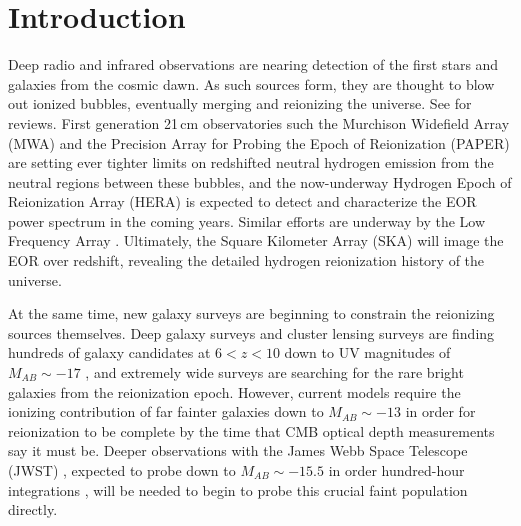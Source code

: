 \documentclass[numberedappendix]{emulateapj}
\begin{document}
\section{Introduction}

Deep radio and infrared observations are nearing detection of the first stars and galaxies from the cosmic dawn. As such sources form, they are thought to blow out ionized bubbles, eventually merging and reionizing the universe. See \citet{FurlanettoReview,miguelreview,PritchardLoebReview,Mesinger16} for reviews. First generation 21\,cm observatories such the Murchison Widefield Array (MWA) \citep{tingay13,mwascience} and the Precision Array for Probing the Epoch of Reionization (PAPER) \citep{parsons14,ali15,PoberPAPER64Heating,DannyMultiRedshift} are setting ever tighter limits on redshifted neutral hydrogen emission from the neutral regions between these bubbles, and the now-underway Hydrogen Epoch of Reionization Array (HERA) \citep{deboer16,neben16b,ewallwice16,patra16} is expected to detect and characterize the EOR power spectrum in the coming years. Similar efforts are underway by the Low Frequency Array \citep{lofareorpaper,lofar}. Ultimately, the Square Kilometer Array (SKA)  \citep{ska,ska1,ska2,ska3} will image the EOR over redshift, revealing the detailed hydrogen reionization history of the universe. 

At the same time, new galaxy surveys are beginning to constrain the reionizing sources themselves. Deep galaxy surveys \citep{Bowler2017,Roberts-Borsani2016,Bowler2015,Wilkins12015,Bouwens2015,Bouwens2013,Dunlop2013,Illingworth2013,Ellis2013,Robertson2013,Oesch2013,Grogin2011,Bouwens2011} and cluster lensing surveys \citep{Livermore2016,Ebeling2016,McLeod2016,Bouwens2016,Bouwens2016a,Coe2015,Huang2015,McLeod2015,Atek2015} are finding hundreds of galaxy candidates at $6<z<10$ down to UV magnitudes of $M_{AB}\sim-17$ \citep{Finkelstein2015}, and extremely wide surveys are searching for the rare bright galaxies \citep{Bernard2016,Calvi,Schmidt2014,Bradley2012,Trenti2011} from the reionization epoch. However, current models require the ionizing contribution of far fainter galaxies down to $M_{AB}\sim-13$ \citep{Bouwens2016b,Alvarez2012} in order for reionization to be complete by the time that CMB optical depth measurements \citep{planck16} say it must be. Deeper observations with the James Webb Space Telescope (JWST) \citep{Gardner2006}, expected to probe down to $M_{AB}\sim-15.5$ in order hundred-hour integrations \citep{Finkelstein2015}, will be needed to begin to probe this crucial faint population directly.
\end{document}
